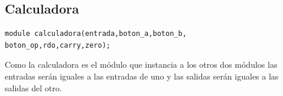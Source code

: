 \documentclass[letterpaper]{sae}
\begin{document}
\subsection{Calculadora}
\begin{verbatim}
module calculadora(entrada,boton_a,boton_b,
boton_op,rdo,carry,zero);
\end{verbatim}

\begin{figure}[H] %
\label{fig:calculadora}
\end{figure}

Como la calculadora es el módulo que instancia a los otros dos módulos las entradas serán iguales a las entradas de uno
y las salidas serán iguales a las salidas del otro.
\end{document}
